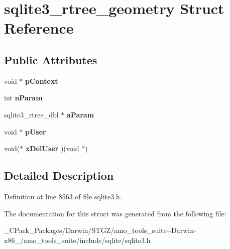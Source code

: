 \hypertarget{structsqlite3__rtree__geometry}{}\section{sqlite3\+\_\+rtree\+\_\+geometry Struct Reference}
\label{structsqlite3__rtree__geometry}
\subsection*{Public Attributes}
\begin{DoxyCompactItemize}
\item 
\mbox{\label{structsqlite3__rtree__geometry_a33f98691626846c1317419654d5c5f51}} 
void $\ast$ {\bfseries p\+Context}
\item 
\mbox{\label{structsqlite3__rtree__geometry_ada7b9eba82660e3321dd4c93526697c9}} 
int {\bfseries n\+Param}
\item 
\mbox{\label{structsqlite3__rtree__geometry_a42eafbc0dcb02ed32a0a4b10ff887416}} 
sqlite3\+\_\+rtree\+\_\+dbl $\ast$ {\bfseries a\+Param}
\item 
\mbox{\label{structsqlite3__rtree__geometry_a6fdedfd741cf5055f9562298cd32dc74}} 
void $\ast$ {\bfseries p\+User}
\item 
\mbox{\label{structsqlite3__rtree__geometry_afa1ed10f488b306df354efe56efdf287}} 
void($\ast$ {\bfseries x\+Del\+User} )(void $\ast$)
\end{DoxyCompactItemize}


\subsection{Detailed Description}


Definition at line 8563 of file sqlite3.\+h.



The documentation for this struct was generated from the following file\+:\begin{DoxyCompactItemize}
\item 
\+\_\+\+C\+Pack\+\_\+\+Packages/\+Darwin/\+S\+T\+G\+Z/amo\+\_\+tools\+\_\+suite-\/-\/\+Darwin-\/x86\+\_/amo\+\_\+tools\+\_\+suite/include/sqlite/sqlite3.\+h\end{DoxyCompactItemize}
